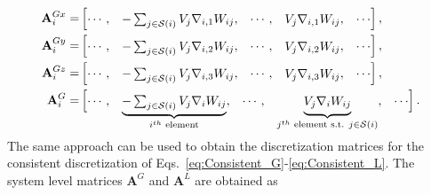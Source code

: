 \begin{align}\renewcommand{\arraystretch}{1.2}
\mathbf{A}^{Gx}_i=& \begin{bmatrix}
\cdots, & 
\smash[b]{\begin{matrix}-\sum_{j \in \support{i}} V_j \nabla_{i,1} W_{ij} \end{matrix} },
&\cdots, &\smash[b]{{\begin{matrix}V_j \nabla_{i,1} W_{ij}\end{matrix}}}, & \cdots
\end{bmatrix},\\
\mathbf{A}^{Gy}_i=& \begin{bmatrix}
\cdots, & 
\smash[b]{\begin{matrix}-\sum_{j \in \support{i}} V_j \nabla_{i,2} W_{ij} \end{matrix} },
&\cdots, &\smash[b]{{\begin{matrix}V_j \nabla_{i,2} W_{ij}\end{matrix}}}, & \cdots
\end{bmatrix},\\
\mathbf{A}^{Gz}_i=& \begin{bmatrix}
\cdots, & 
\smash[b]{\begin{matrix}-\sum_{j \in \support{i}} V_j \nabla_{i,3} W_{ij} \end{matrix} },
&\cdots, &\smash[b]{{\begin{matrix}V_j \nabla_{i,3} W_{ij}\end{matrix}}}, & \cdots
\end{bmatrix},\\
\mathbf{A}^{G}_i=& \begin{bmatrix}
\cdots, & 
\smash[b]{\underbrace{\begin{matrix}-\sum_{j \in \support{i}} V_j \nabla_i W_{ij} \end{matrix}}_{i^{th}\text{ element} }} ,
&\cdots, &\smash[b]{\underbrace{\begin{matrix}V_j \nabla_i W_{ij}\end{matrix}}_{j^{th}\text{ element s.t. }{j \in \support{i}} }}, & \cdots
\end{bmatrix}\label{eq:AGMat}.
\end{align}
\\
The same approach can be used to obtain the discretization matrices for the consistent discretization of Eqs.~\ref{eq:Consistent_G}-\ref{eq:Consistent_L}. The system level matrices $\mathbf{A}^G$ and $\mathbf{A}^L$ are obtained as

